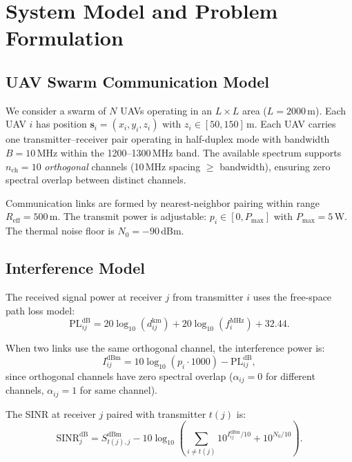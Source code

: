 \documentclass[journal]{IEEEtran}
\begin{document}
\section{System Model and Problem Formulation}
\label{sec:system}

\subsection{UAV Swarm Communication Model}

We consider a swarm of $N$ UAVs operating in an $L \times L$ area ($L = 2000$\,m). Each UAV $i$ has position $\mathbf{s}_i = (x_i, y_i, z_i)$ with $z_i \in [50, 150]$\,m. Each UAV carries one transmitter--receiver pair operating in half-duplex mode with bandwidth $B = 10$\,MHz within the 1200--1300\,MHz band. The available spectrum supports $n_{\text{ch}} = 10$ \emph{orthogonal} channels (10\,MHz spacing $\geq$ bandwidth), ensuring zero spectral overlap between distinct channels.

Communication links are formed by nearest-neighbor pairing within range $R_{\text{eff}} = 500$\,m. The transmit power is adjustable: $p_i \in [0, P_{\max}]$ with $P_{\max} = 5$\,W. The thermal noise floor is $N_0 = -90$\,dBm.

\subsection{Interference Model}

The received signal power at receiver $j$ from transmitter $i$ uses the free-space path loss model:
\begin{equation}
\text{PL}_{ij}^{\text{dB}} = 20\log_{10}(d_{ij}^{\text{km}}) + 20\log_{10}(f_i^{\text{MHz}}) + 32.44.
\end{equation}

When two links use the same orthogonal channel, the interference power is:
\begin{equation}
I_{ij}^{\text{dBm}} = 10\log_{10}(p_i \cdot 1000) - \text{PL}_{ij}^{\text{dB}},
\end{equation}
since orthogonal channels have zero spectral overlap ($\alpha_{ij} = 0$ for different channels, $\alpha_{ij} = 1$ for same channel).

The SINR at receiver $j$ paired with transmitter $t(j)$ is:
\begin{equation}
\text{SINR}_j^{\text{dB}} = S_{t(j),j}^{\text{dBm}} - 10\log_{10}\!\left(\sum_{i \neq t(j)} 10^{I_{ij}^{\text{dBm}}/10} + 10^{N_0/10}\right).
\end{equation}
\end{document}
